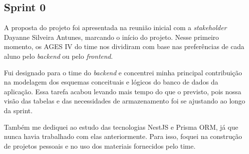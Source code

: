 \subsection{Sprint 0}

A proposta do projeto foi apresentada na reunião inicial com a \textit{stakeholder} Dayanne Silveira Antunes, marcando o início do projeto. Nesse primeiro momento, os AGES IV do time nos dividiram com base nas preferências de cada aluno pelo \textit{backend} ou pelo \textit{frontend}.

Fui designado para o time do \textit{backend} e concentrei minha principal contribuição na modelagem dos esquemas conceituais e lógicos do banco de dados da aplicação. Essa tarefa acabou levando mais tempo do que o previsto, pois nossa visão das tabelas e das necessidades de armazenamento foi se ajustando ao longo da sprint.

Também me dediquei ao estudo das tecnologias NestJS e Prisma ORM, já que nunca havia trabalhado com elas anteriormente. Para isso, foquei na construção de projetos pessoais e no uso dos materiais fornecidos pelo time.
\\

\noindent{}

